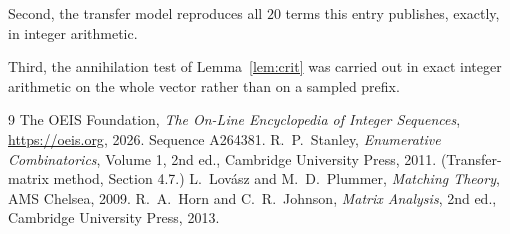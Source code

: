 \documentclass[11pt,a4paper]{article}
\theoremstyle{plain}
\theoremstyle{definition}
\begin{document}
Second, the transfer model reproduces all $20$ terms this entry publishes, exactly, in
integer arithmetic.

Third, the annihilation test of Lemma~\ref{lem:crit} was carried out in exact integer
arithmetic on the whole vector rather than on a sampled prefix.

\begin{thebibliography}{9}
 The OEIS Foundation, \emph{The On-Line Encyclopedia of Integer
Sequences}, \url{https://oeis.org}, 2026. Sequence A264381.
 R.~P.~Stanley, \emph{Enumerative Combinatorics}, Volume 1, 2nd ed.,
Cambridge University Press, 2011. (Transfer-matrix method, Section 4.7.)
 L.~Lov\'asz and M.~D.~Plummer, \emph{Matching Theory}, AMS Chelsea, 2009.
 R.~A.~Horn and C.~R.~Johnson, \emph{Matrix Analysis}, 2nd ed., Cambridge
University Press, 2013.
\end{thebibliography}
\end{document}
